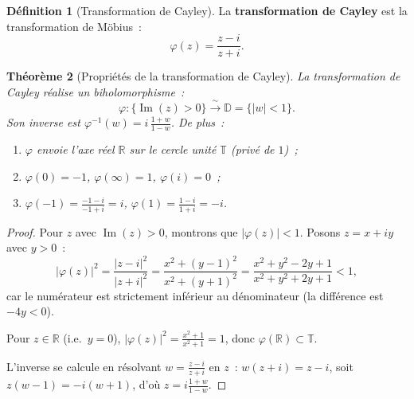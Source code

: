 \documentclass[12pt,a4paper,openany]{book}
\theoremstyle{definition}
\newtheorem{definition}{Définition}[chapter]
\theoremstyle{plain}
\newtheorem{theoreme}[definition]{Théorème}
\theoremstyle{remark}
\newcommand{\R}{\mathbb{R}}
\newcommand{\D}{\mathbb{D}}
\newcommand{\T}{\mathbb{T}}
\DeclareMathOperator{\im}{Im}
\newcommand{\abs}[1]{\left|#1\right|}
\begin{document}
\begin{definition}[Transformation de Cayley]\label{def:cayley}
La \textbf{transformation de Cayley} est la transformation de Möbius~:
\[
  \varphi(z) = \frac{z - i}{z + i}.
\]
\end{definition}

\begin{theoreme}[Propriétés de la transformation de Cayley]\label{thm:cayley}
La transformation de Cayley réalise un biholomorphisme~:
\[
  \varphi \colon \{\im(z) > 0\} \xrightarrow{\;\sim\;} \D = \{\abs{w} < 1\}.
\]
Son inverse est $\varphi^{-1}(w) = i\,\frac{1+w}{1-w}$.
De plus~:
\begin{enumerate}[label=(\roman*)]
  \item $\varphi$ envoie l'axe réel $\R$ sur le cercle unité $\T$ (privé de $1$)~;
  \item $\varphi(0) = -1$, $\varphi(\infty) = 1$, $\varphi(i) = 0$~;
  \item $\varphi(-1) = \frac{-1-i}{-1+i} = i$, $\varphi(1) = \frac{1-i}{1+i} = -i$.
\end{enumerate}
\end{theoreme}

\begin{proof}
Pour $z$ avec $\im(z) > 0$, montrons que $\abs{\varphi(z)} < 1$. Posons $z = x + iy$
avec $y > 0$~:
\[
  \abs{\varphi(z)}^2 = \frac{\abs{z-i}^2}{\abs{z+i}^2}
  = \frac{x^2 + (y-1)^2}{x^2 + (y+1)^2}
  = \frac{x^2 + y^2 - 2y + 1}{x^2 + y^2 + 2y + 1} < 1,
\]
car le numérateur est strictement inférieur au dénominateur (la différence est $-4y < 0$).

Pour $z \in \R$ (i.e.\ $y = 0$), $\abs{\varphi(z)}^2 = \frac{x^2+1}{x^2+1} = 1$,
donc $\varphi(\R) \subset \T$.

L'inverse se calcule en résolvant $w = \frac{z-i}{z+i}$ en $z$~:
$w(z+i) = z - i$, soit $z(w-1) = -i(w+1)$, d'où $z = i\frac{1+w}{1-w}$.
\end{proof}
\end{document}
